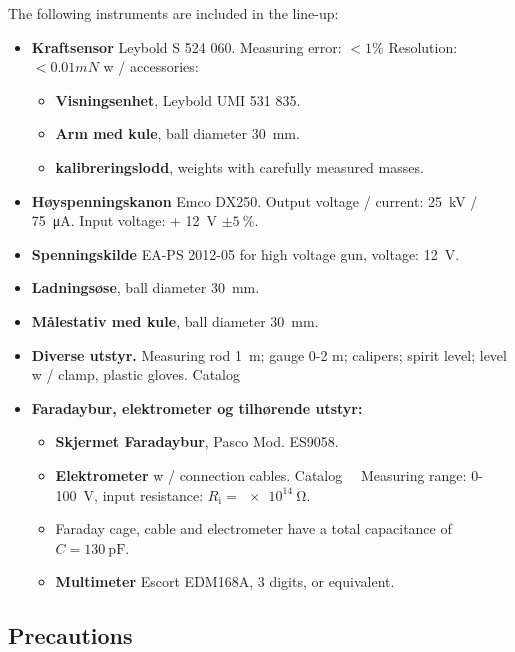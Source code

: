 \documentclass[../Elmag-labhefte-2020.tex]{subfiles}
\begin{document}
\begin{itemize}
The following instruments are included in the line-up:
\vspace{-4mm}
\begin{itemize}
    \item \textbf{Kraftsensor} Leybold S 524 060. Measuring error: $< 1\%$
Resolution: $< 0.01 mN$
    w / accessories:
    \vspace{-2mm}
    \begin{itemize}
        \item \textbf{Visningsenhet}, Leybold UMI 531 835.
        \item \textbf{Arm med kule}, ball diameter \SI{30}{\milli\m}.
        \item \textbf{kalibreringslodd}, weights with carefully measured masses.
    \end{itemize}
    \item \textbf{Høyspenningskanon} Emco DX250. Output voltage / current: \SI{25}{\kilo\volt} / \SI{75}{\micro\ampere}. Input voltage: + \SI{12}{\volt} $\pm \SI{5}{\percent}$.
    \item \textbf{Spenningskilde} EA-PS 2012-05 for high voltage gun, voltage: \SI{12}{\volt}.
    \item \textbf{Ladningsøse}, ball diameter \SI{30}{\milli\m}.
    \item \textbf{Målestativ med kule}, ball diameter \SI{30}{\milli\m}.
    \item \textbf{Diverse utstyr.} Measuring rod \SI{1}{\m}; gauge 0-2 \si{\m}; calipers; spirit level; level w / clamp, plastic gloves.
    Catalog \item \textbf{Faradaybur, elektrometer og tilhørende utstyr:}
    \vspace{-2mm}
    \begin{itemize}
        \item \textbf{Skjermet Faradaybur}, Pasco Mod. ES9058.
        \item \textbf{Elektrometer} w / connection cables. Catalog \ \
              Measuring range: 0- \SI{100}{\volt}, input resistance: $R_\text{i} = \SI{e14}{\ohm}$.
        \item Faraday cage, cable and electrometer have a total capacitance of $C = \SI{130}{\pico\farad}$.
        \item \textbf{Multimeter} Escort EDM168A, 3 digits, or equivalent.
    \end{itemize}
\end{itemize}

\subsection{Precautions}


\end{itemize}
\end{document}
